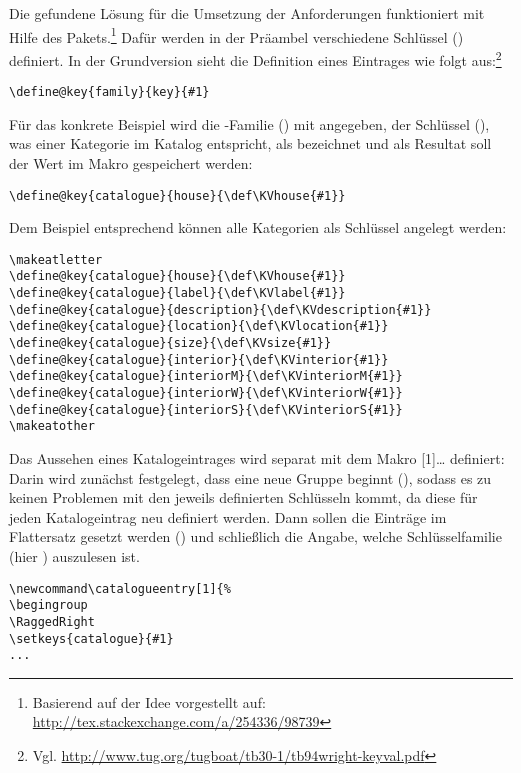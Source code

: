 \documentclass[ngerman]{dtk}
\makeatletter
\newcommand\catalogueentry[1]{%
\RaggedRight\begingroup
\setkeys{catalogue}{#1}%
\ifdef{\KVhouse}{\section{\KVhouse
			\ifdef{\KVlabel}{\label{\KVlabel}}{}}
			}{}%
\begin{labeling}{Beschreibung}
\ifdef{\KVdescription}{\item[Beschreibung] \KVdescription}{}%
\ifdef{\KVlocation}{\item[Verortung] \KVlocation}{}%
\ifdef{\KVinterior}{%
	\item[Ausstattung] \KVinterior %
	\ifboolexpr{bool{@KVinteriorM} or bool {@KVinteriorW} or bool {@KVinteriorS}}{%
	\begin{labeling}{Wandgemälde}
			\ifdef{\KVinteriorM}{\item[Mosaike:] \KVinteriorM}{}
			\ifdef{\KVinteriorW}{\item[Wandgemälde:] \KVinteriorW}{}
			\ifdef{\KVinteriorS}{\item[Statuen:] \KVinteriorS}{}
			\end{labeling}
		}{}}%
	{%
	\ifboolexpr{bool{@KVinteriorM} or bool {@KVinteriorW} or bool {@KVinteriorS}}{%
		\item[Ausstattung]%
	\begin{labeling}{Wandgemälde}	
				\ifdef{\KVinteriorM}{\item[Mosaike:] \KVinteriorM}{}
				\ifdef{\KVinteriorW}{\item[Wandgemälde:] \KVinteriorW}{}
				\ifdef{\KVinteriorS}{\item[Statuen:] \KVinteriorS}{}
			\end{labeling}
	}{}}%
\ifdef{\KVsize}{	\item[Größe] \SI{\KVsize}{\meter\squared}}{}%
\ifdef{\KVbackref}{\item[Erwähnungen]S.\ \KVbackref}{}%
\end{labeling}
\endgroup
}
\makeatother
\begin{document}
Die gefundene Lösung für die Umsetzung der Anforderungen funktioniert mit Hilfe des    Pakets.\footnote{Basierend auf der Idee vorgestellt auf: \url{http://tex.stackexchange.com/a/254336/98739}}
Dafür werden in der Präambel verschiedene Schlüssel () definiert.
In der Grundversion sieht die Definition eines Eintrages wie folgt aus:\footnote{Vgl. \url{http://www.tug.org/tugboat/tb30-1/tb94wright-keyval.pdf}}
\begin{lstlisting}[style=noNumber]
\define@key{family}{key}{#1}
\end{lstlisting}
Für das konkrete Beispiel wird die -Familie () mit  angegeben,
der Schlüssel (), was einer Kategorie im Katalog entspricht, 
als  bezeichnet und als Resultat soll der Wert im Makro  gespeichert werden:
\begin{lstlisting}[style=noNumber]
\define@key{catalogue}{house}{\def\KVhouse{#1}}
\end{lstlisting}
Dem Beispiel entsprechend können alle Kategorien als Schlüssel angelegt werden:
\begin{lstlisting}[style=number]
\makeatletter
\define@key{catalogue}{house}{\def\KVhouse{#1}}
\define@key{catalogue}{label}{\def\KVlabel{#1}}
\define@key{catalogue}{description}{\def\KVdescription{#1}}
\define@key{catalogue}{location}{\def\KVlocation{#1}}
\define@key{catalogue}{size}{\def\KVsize{#1}}
\define@key{catalogue}{interior}{\def\KVinterior{#1}}
\define@key{catalogue}{interiorM}{\def\KVinteriorM{#1}}
\define@key{catalogue}{interiorW}{\def\KVinteriorW{#1}}
\define@key{catalogue}{interiorS}{\def\KVinteriorS{#1}}
\makeatother
\end{lstlisting}
Das Aussehen eines Katalogeintrages wird separat mit dem Makro
 [1]{\ldots} 
definiert:
Darin wird zunächst festgelegt,
dass eine neue Gruppe beginnt (), sodass
es zu keinen Problemen mit den jeweils definierten Schlüsseln kommt, 
da diese für jeden Katalogeintrag neu definiert werden.
Dann sollen die  Einträge im Flattersatz gesetzt werden () und schließlich die Angabe,
 welche Schlüsselfamilie (hier ) auszulesen ist.
\begin{lstlisting}[style=number]
\newcommand\catalogueentry[1]{%
\begingroup
\RaggedRight
\setkeys{catalogue}{#1}
...
\end{lstlisting}
\end{document}
